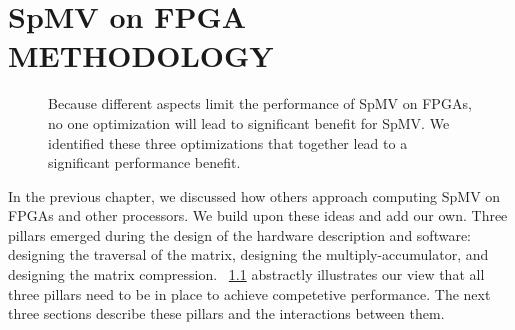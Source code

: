 \chapter{SpMV on FPGA METHODOLOGY}
\label{chp:method}

\begin{figure}
    \centering
    \caption[The three pillars of optimization for computing SpMV on FPGAs.]{Because different aspects limit the performance of SpMV on FPGAs, no one optimization will lead to significant benefit for SpMV. We identified these three optimizations that together lead to a significant performance benefit.}
    \label{fig:pillars}
\end{figure}

In the previous chapter, we discussed how others approach computing SpMV on FPGAs and other processors. We build upon these ideas and add our own. Three pillars emerged during the design of the hardware description and software: designing the traversal of the matrix, designing the multiply-accumulator, and designing the matrix compression. \figurename~\ref{fig:pillars} abstractly illustrates our view that all three pillars need to be in place to achieve competetive performance. The next three sections describe these pillars and the interactions between them.

